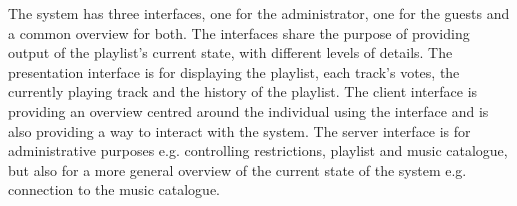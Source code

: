 The system has three interfaces, one for the administrator, one for the guests and a common overview for both. The interfaces share the purpose of providing output of the playlist's current state, with different levels of details. The presentation interface is for displaying the playlist, each track's votes, the currently playing track and the history of the playlist. The client interface is providing an overview centred around the individual using the interface and is also providing a way to interact with the system. The server interface is for administrative purposes e.g. controlling restrictions, playlist and music catalogue, but also for a more general overview of the current state of the system e.g. connection to the music catalogue.
